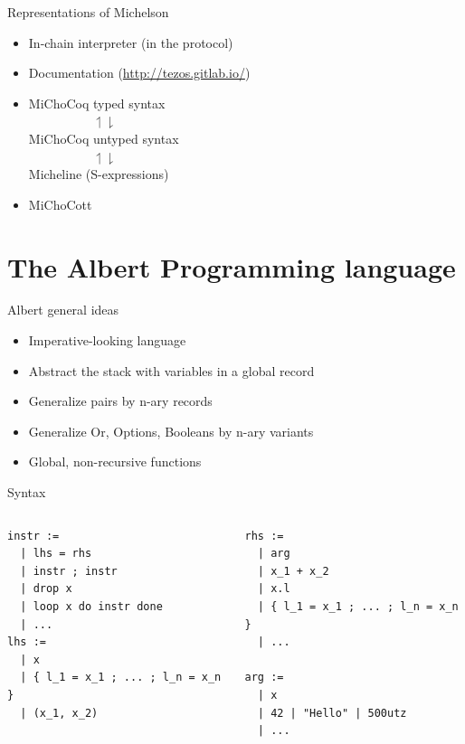 \documentclass[aspectratio=169]{beamer}
\begin{document}
\begin{frame}{Representations of Michelson}
  \begin{itemize}
    \item In-chain interpreter (in the protocol)
    \item Documentation (\url{http://tezos.gitlab.io/})
    \item MiChoCoq typed syntax\\
      $\mspace{90mu}\upharpoonleft \downharpoonright$ \\
      MiChoCoq untyped syntax \\
      $\mspace{90mu}\upharpoonleft \downharpoonright$ \\
      Micheline (S-expressions)
    \item MiChoCott
  \end{itemize}
\end{frame}

\section{The Albert Programming language}

\begin{frame}{Albert general ideas}
  \begin{itemize}
    \item Imperative-looking language
    \item Abstract the stack with variables in a global record
    \item Generalize pairs by n-ary records
    \item Generalize Or, Options, Booleans by n-ary variants
    \item Global, non-recursive functions
  \end{itemize}
\end{frame}

\begin{frame}[fragile]{Syntax}
  \begin{columns}
    \begin{column}{.5\linewidth}
\begin{verbatim}
instr :=
  | lhs = rhs
  | instr ; instr
  | drop x
  | loop x do instr done
  | ...
lhs :=
  | x
  | { l_1 = x_1 ; ... ; l_n = x_n }
  | (x_1, x_2)
\end{verbatim}
    \end{column}
    \begin{column}{.5\linewidth}
\begin{verbatim}
rhs :=
  | arg
  | x_1 + x_2
  | x.l
  | { l_1 = x_1 ; ... ; l_n = x_n }
  | ...

arg :=
  | x
  | 42 | "Hello" | 500utz
  | ...
\end{verbatim}
    \end{column}
  \end{columns}
\end{frame}
\end{document}
